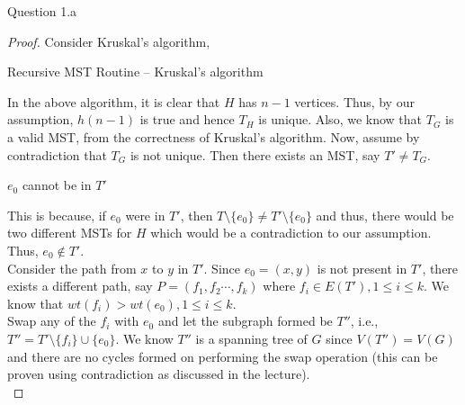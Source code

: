 \begin{solution}{Question 1.a}
\begin{proof}
        Consider Kruskal's algorithm,
        \begin{algorithm}[H]
            \caption{Recursive MST Routine -- Kruskal's algorithm} %
            \begin{algorithmic}[1]
                    \Else{}
                    \EndIf{}
                \EndFor{}
                    \Else{}
                    \EndIf{}
                \EndFor{}
            \end{algorithmic}
        \end{algorithm}
        In the above algorithm, it is clear that $H$ has $n-1$ vertices. Thus, by our assumption, $h(n-1)$ is true and hence $T_H$ is unique. Also, we know that $T_G$ is a valid MST, from the correctness of Kruskal's algorithm. Now, assume by contradiction that $T_G$ is not unique. Then there exists an MST, say $T'\neq T_G$.
        \begin{claim}[]
            $e_0$ cannot be in $T'$
        \end{claim}
        This is because, if $e_0$ were in $T'$, then $T\setminus\{e_0\}\neq T'\setminus\{e_0\}$ and thus, there would be two different MSTs for $H$ which would be a contradiction to our assumption. Thus, $e_0\notin T'$.\\
        Consider the path from $x$ to $y$ in $T'$. Since $e_0=(x, y)$ is not present in $T'$, there exists a different path, say $P=(f_1,f_2\cdots,f_k)$ where $f_i\in E(T'), 1\leq i \leq k$. We know that $wt(f_i) > wt(e_0), 1 \leq i \leq k$.\\
        Swap any of the $f_i$ with $e_0$ and let the subgraph formed be $T''$, i.e., $T''=T'\setminus\{f_i\}\cup\{e_0\}$. We know $T''$ is a spanning tree of $G$ since $V(T'')=V(G)$ and there are no cycles formed on performing the swap operation (this can be proven using contradiction as discussed in the lecture).\\

\end{proof}
\end{solution}

